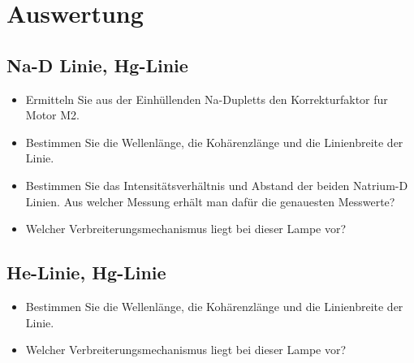 \documentclass[a4paper, twoside]{article}
\begin{document}
\section{Auswertung}
\subsection{Na-D Linie, Hg-Linie}
\begin{itemize}
\item Ermitteln Sie aus der Einhüllenden Na-Dupletts den Korrekturfaktor fur Motor M2.
\item Bestimmen Sie die Wellenlänge, die Kohärenzlänge und die Linienbreite der Linie.
\item Bestimmen Sie das Intensitätsverhältnis und Abstand der beiden Natrium-D Linien. Aus welcher Messung erhält man dafür die genauesten Messwerte?
\item Welcher Verbreiterungsmechanismus liegt bei dieser Lampe vor?
\end{itemize}
\subsection{He-Linie, Hg-Linie}
\begin{itemize}
\item Bestimmen Sie die Wellenlänge, die Kohärenzlänge und die Linienbreite der Linie.
\item Welcher Verbreiterungsmechanismus liegt bei dieser Lampe vor?
\end{itemize}
\end{document}
